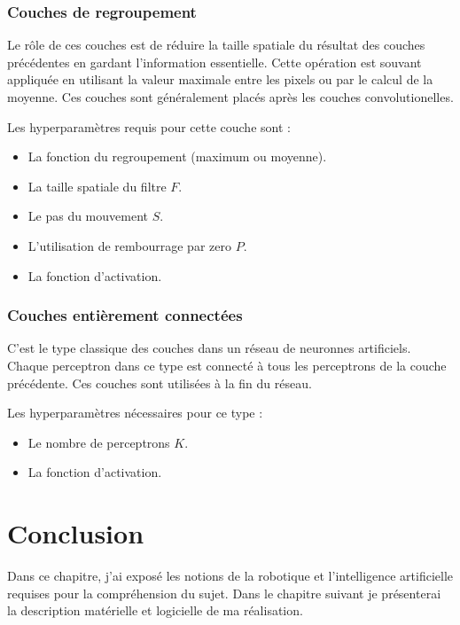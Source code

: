 \subsubsection{Couches de regroupement}

Le rôle de ces couches est de réduire la taille spatiale du résultat des couches
précédentes en gardant l'information essentielle. Cette opération est souvant
appliquée en utilisant la valeur maximale entre les pixels ou par le calcul de
la moyenne. Ces couches sont généralement placés après les couches
convolutionelles.

Les hyperparamètres requis pour cette couche sont :

\begin{itemize}
  \item La fonction du regroupement (maximum ou moyenne).
  \item La taille spatiale du filtre $F$.
  \item Le pas du mouvement $S$.
  \item L'utilisation de rembourrage par zero $P$.
  \item La fonction d'activation.
\end{itemize}

\subsubsection{Couches entièrement connectées}

C'est le type classique des couches dans un réseau de neuronnes artificiels.
Chaque perceptron dans ce type est connecté à tous les perceptrons de la couche
précédente. Ces couches sont utilisées à la fin du réseau.

Les hyperparamètres nécessaires pour ce type :

\begin{itemize}
  \item Le nombre de perceptrons $K$.
  \item La fonction d'activation.
\end{itemize}

\section{Conclusion}

Dans ce chapitre, j'ai exposé les notions de la robotique et l'intelligence
artificielle requises pour la compréhension du sujet. Dans le chapitre suivant
je présenterai la description matérielle et logicielle de ma réalisation.
